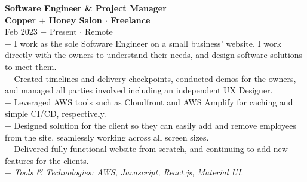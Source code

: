 \documentclass{resume}
\begin{document}
\begin{flushleft}
\normalsize{\bf Software Engineer \& Project Manager}\\
\footnotesize{\bf Copper $+$ Honey Salon $\cdot$ Freelance}\\
\footnotesize{Feb 2023 $-$ Present $\cdot$ Remote}\\[1mm]
{\scriptsize
	$-$ I work as the sole Software Engineer on a small business' website. I work directly with the owners to understand their needs, and design software solutions to meet them.\\
	$-$ Created timelines and delivery checkpoints, conducted demos for the owners, and managed all parties involved including an independent UX Designer.\\
	$-$ Leveraged AWS tools such as Cloudfront and AWS Amplify for caching and simple CI/CD, respectively.\\
	$-$ Designed solution for the client so they can easily add and remove employees from the site, seamlessly working across all screen sizes.\\
	$-$ Delivered fully functional website from scratch, and continuing to add new features for the clients.\\
	$-$ \textit{Tools \& Technologies: AWS, Javascript, React.js, Material UI.}
}\\[3mm]


\end{flushleft}
\end{document}
